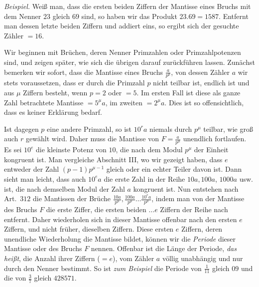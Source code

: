 \textit{Beispiel.} Weiß man, dass die ersten beiden Ziffern der Mantisse eines Bruchs mit dem Nenner \(23\) gleich \(69\) sind, so haben wir das Produkt \(23.69=1587\). Entfernt man dessen letzte beiden Ziffern und addiert eins, so ergibt sich der gesuchte Zähler \(=16\).

Wir beginnen mit Brüchen, deren Nenner Primzahlen oder Primzahlpotenzen sind, und zeigen später, wie sich die übrigen darauf zurückführen lassen. Zunächst bemerken wir sofort, dass die Mantisse eines Bruchs \(\frac a{p^\mu}\), von dessen Zähler \(a\) wir stets voraussetzen, dass er durch die Primzahl \(p\) nicht teilbar ist, endlich ist und aus \(\mu\) Ziffern besteht, wenn \(p=2\) oder \(=5\). Im ersten Fall ist diese als ganze Zahl betrachtete Mantisse \(=5^\mu a\), im zweiten \(=2^\mu a\). Dies ist so offensichtlich, dass es keiner Erklärung bedarf.

Ist dagegen \(p\) eine andere Primzahl, so ist \(10^r a\) niemals durch \(p^\mu\) teilbar, wie groß auch \(r\) gewählt wird. Daher muss die Mantisse von \(F=\frac a{p^\mu}\) unendlich fortlaufen. Es sei \(10^e\) die kleinste Potenz von \(10\), die nach dem Modul \(p^\mu\) der Einheit kongruent ist. Man vergleiche Abschnitt III, wo wir gezeigt haben, dass \(e\) entweder der Zahl \((p-1)p^{\mu-1}\) gleich oder ein echter Teiler davon ist. Dann sieht man leicht, dass auch \(10^e a\) die erste Zahl in der Reihe \(10a,100a\), \(1000a\) usw. ist, die nach demselben Modul der Zahl \(a\) kongruent ist. Nun entstehen nach Art.\ \(312\) die Mantissen der Brüche \(\frac{10a}{p^\mu},\frac{100a}{p^\mu}\ldots\frac{10^e a}{p^\mu}\), indem man von der Mantisse
des Bruchs \(F\) die erste Ziffer, die ersten beiden \(\ldots e\) Ziffern der Reihe nach entfernt. Daher wiederholen sich in dieser Mantisse offenbar nach den ersten \(e\) Ziffern, und nicht früher, dieselben Ziffern. Diese ersten \(e\) Ziffern, deren unendliche Wiederholung die Mantisse bildet, können wir die \textit{Periode} dieser Mantisse oder des Bruchs \(F\) nennen. Offenbar ist die Länge der Periode, \textit{das heißt}, die Anzahl ihrer Ziffern (\(=e\)), vom Zähler \(a\) völlig unabhängig und nur durch den Nenner bestimmt. So ist \textit{zum Beispiel} die Periode von \(\frac1{11}\) gleich \(09\) und die von \(\frac37\) gleich \(428571\).

